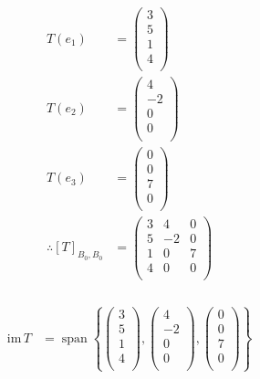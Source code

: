 \documentclass[fleqn, a4paper, twocolumn, draft]{article}
\DeclareMathOperator{\vspan}{\mathrm{span}} %
\theoremstyle{definition}
\theoremstyle{theorem}
\theoremstyle{remark}
\newcommand{\im}{\mathrm{im}\,}
\numberwithin{corollary}{theorem}
\numberwithin{equation}{theorem}
\begin{document}
\begin{align*}
	T(e_1) &= 
		\begin{pmatrix}
			3\\
			5\\
			1\\
			4\\
		\end{pmatrix}\\
	T(e_2) &= 
		\begin{pmatrix}
			4\\
			-2\\
			0\\
			0\\
		\end{pmatrix}\\
	T(e_3) &= 
		\begin{pmatrix}
			0\\
			0\\
			7\\
			0\\
		\end{pmatrix}\\
	\therefore [T]_{B_0, B_0} &= 
		\begin{pmatrix}
			3 & 4 & 0\\
			5 & -2 & 0\\
			1 & 0 & 7\\
			4 & 0 & 0\\
		\end{pmatrix}
\end{align*}

\subsubsection{}

\begin{align*}
	\im T &= \vspan
		\left\lbrace
			\begin{pmatrix}
				3\\
				5\\
				1\\
				4\\
			\end{pmatrix}
			,
			\begin{pmatrix}
				4\\
				-2\\
				0\\
				0\\
			\end{pmatrix}
			,
			\begin{pmatrix}
				0\\
				0\\
				7\\
				0\\
			\end{pmatrix}
		\right\rbrace
\end{align*}
\end{document}
